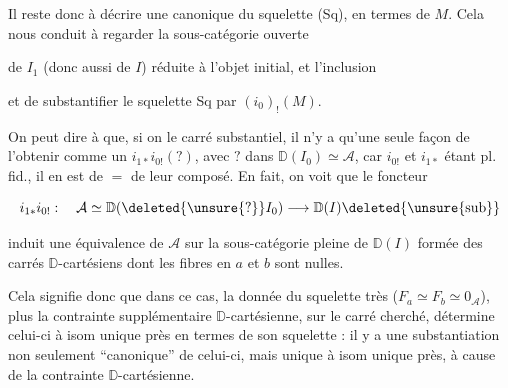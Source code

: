 Il reste donc à décrire une  canonique du squelette (Sq), en termes de $M$. Cela nous conduit à regarder la sous-catégorie ouverte


de $I_1$ (donc aussi de $I$) réduite à l'objet initial, et l'inclusion


et de  substantifier le squelette Sq par $(i_0)_!(M)$.

On peut dire à  que, si on  le carré substantiel, il n'y a  qu'une seule façon de l'obtenir comme un $i_{1*}i_{0!}(?)$, avec $?$ dans $\mathbb D(I_0)\simeq\mathcal A$, car $i_{0!}$ et $i_{1*}$ étant pl. fid., il en est de $=$ de leur composé. 
En fait, on voit  que le foncteur

\[
i_{1*}i_{0!}:\quad\mathcal A\simeq\mathbb D(\deleted{\unsure{?}}I_0)\longrightarrow\mathbb D(I)\deleted{\unsure{\mathrm{sub}}}
\]

induit une équivalence de $\mathcal A$ sur la sous-catégorie pleine de $\mathbb D(I)$ formée des carrés $\mathbb D$-cartésiens  dont les fibres en $a$ et $b$ sont nulles. 

Cela signifie donc que dans ce cas, la donnée du squelette  très  ($F_a\simeq F_b\simeq0_{\mathcal A}$), plus la contrainte supplémentaire $\mathbb D$-cartésienne, sur le carré cherché, détermine celui-ci à isom unique près en termes de son squelette : il y a une substantiation non seulement ``canonique'' de celui-ci, mais  unique à isom unique près,  à cause de la contrainte $\mathbb D$-cartésienne.

